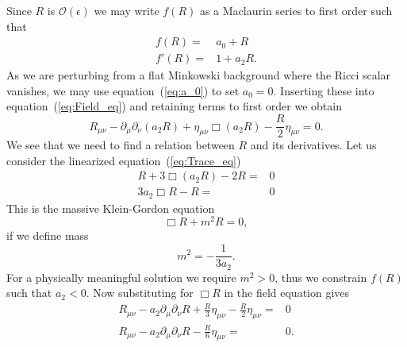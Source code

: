 \documentclass[a4paper, 11pt, titlepage, twoside]{report}
\newcommand{\eqnref}[1]{equation~(\ref{eq:#1})}
\newcommand{\recip}[1]{\ensuremath{\frac{1}{#1}}}
\newcommand{\order}[1]{\ensuremath{\mathcal{O}({#1})}}
\begin{document}
Since $R$ is $\order{\epsilon}$ we may write $f(R)$ as a Maclaurin series to first order such that
\begin{align}
f(R) = {} & a_0 + R\\
f'(R) = {} & 1 + a_2 R.
\end{align}
As we are perturbing from a flat Minkowski background where the Ricci scalar vanishes, we may use \eqnref{a_0} to set $a_0 = 0$. Inserting these into \eqnref{Field_eq} and retaining terms to first order we obtain
\begin{equation}
R_{\mu\nu} - \partial_\mu\partial_\nu(a_2 R) + \eta_{\mu\nu}\Box(a_2 R) - \frac{R}{2}\eta_{\mu\nu} = 0.
\end{equation}
We see that we need to find a relation between $R$ and its derivatives. Let us consider the linearized \eqnref{Trace_eq}
\begin{align}
R + 3 \Box(a_2 R) - 2 R  = {} & 0 \nonumber \\
3a_2 \Box R - R = {} & 0
\label{eq:Box_R}
\end{align}
This is the massive Klein-Gordon equation
\begin{equation}
\Box R + m^2R = 0,
\end{equation}
if we define mass
\begin{equation}
m^2 = -\recip{3a_2}.
\end{equation}
For a physically meaningful solution we require $m^2 > 0$, thus we constrain $f(R)$ such that $a_2 < 0$. Now substituting for $\Box R$ in the field equation gives
\begin{align}
R_{\mu\nu} - a_2 \partial_\mu\partial_\nu R + \frac{R}{3}\eta_{\mu\nu} - \frac{R}{2}\eta_{\mu\nu} = {} & 0 \nonumber \\
R_{\mu\nu} - a_2\partial_\mu\partial_\nu R - \frac{R}{6}\eta_{\mu\nu} = {} & 0.
\label{eq:Field}
\end{align}
\end{document}
